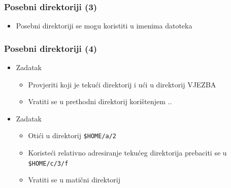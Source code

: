 \documentclass{beamer}
\begin{document}
\begin{frame}[t]
\frametitle{Posebni direktoriji (3)}
\begin{itemize}
  \item Posebni direktoriji se mogu koristiti u imenima datoteka
  \flushleft
\end{itemize}
\end{frame}

\begin{frame}[t]
\frametitle{Posebni direktoriji (4)}
\begin{itemize}
  \item Zadatak
  \begin{itemize}
    \item Provjeriti koji je tekući direktorij i ući u direktorij VJEZBA
    \item Vratiti se u prethodni direktorij korištenjem ..
  \end{itemize}
  \item Zadatak
  \begin{itemize}
    \item Otići u direktorij \texttt{\$HOME/a/2} 
    \item Koristeći relativno adresiranje tekućeg direktorija prebaciti se
          u \texttt{\$HOME/c/3/f}
    \item Vratiti se u matični direktorij
  \end{itemize}
\end{itemize}
\end{frame}
\end{document}
